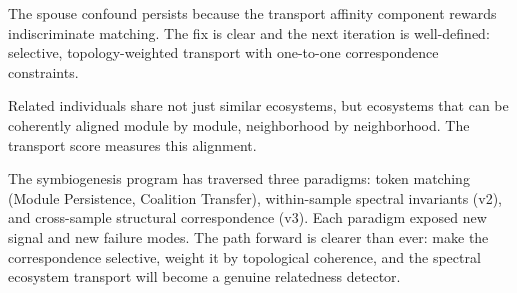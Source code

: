 \documentclass{../yalumba}
\begin{document}
The spouse confound persists because the transport affinity component rewards
indiscriminate matching.  The fix is clear and the next iteration is
well-defined: selective, topology-weighted transport with one-to-one
correspondence constraints.

\begin{pullquote}
Related individuals share not just similar ecosystems, but ecosystems that
can be coherently aligned module by module, neighborhood by neighborhood.
The transport score measures this alignment.
\end{pullquote}

The symbiogenesis program has traversed three paradigms: token matching
(Module Persistence, Coalition Transfer), within-sample spectral invariants
(v2), and cross-sample structural correspondence (v3).  Each paradigm
exposed new signal and new failure modes.  The path forward is clearer than
ever: make the correspondence selective, weight it by topological coherence,
and the spectral ecosystem transport will become a genuine relatedness
detector.




\end{document}
